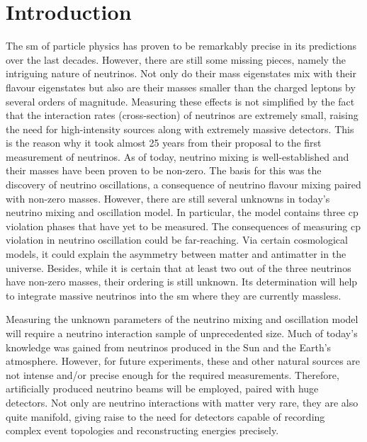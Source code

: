 \chapter{Introduction}
\label{chap:introduction}

The \gls{sm} of particle physics has proven to be remarkably precise in its predictions over the last decades.
However, there are still some missing pieces, namely the intriguing nature of neutrinos.
Not only do their mass eigenstates mix with their flavour eigenstates but also are their masses smaller than the charged leptons by several orders of magnitude.
Measuring these effects is not simplified by the fact that the interaction rates (cross-section) of neutrinos are extremely small, raising the need for high-intensity sources along with extremely massive detectors.
This is the reason why it took almost \num{25} years from their proposal to the first measurement of neutrinos.
As of today, neutrino mixing is well-established and their masses have been proven to be non-zero.
The basis for this was the discovery of neutrino oscillations, a consequence of neutrino flavour mixing paired with non-zero masses.
However, there are still several unknowns in today's neutrino mixing and oscillation model.
In particular, the model contains three \gls{cp} violation phases that have yet to be measured.
The consequences of measuring \gls{cp} violation in neutrino oscillation could be far-reaching.
Via certain cosmological models, it could explain the asymmetry between matter and antimatter in the universe.
Besides, while it is certain that at least two out of the three neutrinos have non-zero masses, their ordering is still unknown.
Its determination will help to integrate massive neutrinos into the \gls{sm} where they are currently massless.

Measuring the unknown parameters of the neutrino mixing and oscillation model will require a neutrino interaction sample of unprecedented size.
Much of today's knowledge was gained from neutrinos produced in the Sun and the Earth's atmosphere.
However, for future experiments, these and other natural sources are not intense and/or precise enough for the required measurements.
Therefore, artificially produced neutrino beams will be employed, paired with huge detectors.
Not only are neutrino interactions with matter very rare, they are also quite manifold, giving raise to the need for detectors capable of recording complex event topologies and reconstructing energies precisely.

